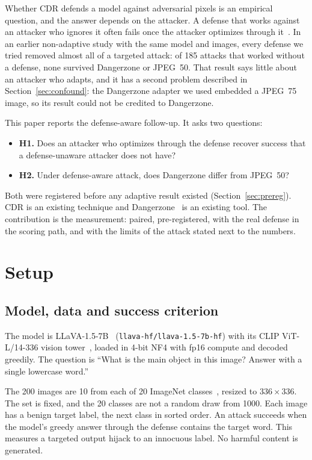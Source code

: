 \documentclass[11pt]{article}
\begin{document}
Whether CDR defends a model against adversarial pixels is an empirical question, and the
answer depends on the attacker. A defense that works against an attacker who ignores it
often fails once the attacker optimizes through it~\cite{athalye2018obfuscated,tramer2020adaptive}.
In an earlier non-adaptive study with the same model and images, every defense we tried
removed almost all of a targeted attack: of 185 attacks that worked without a defense, none
survived Dangerzone or JPEG~50. That result says little about an attacker who adapts, and it
has a second problem described in Section~\ref{sec:confound}: the Dangerzone adapter we
used embedded a JPEG~75 image, so its result could not be credited to Dangerzone.

This paper reports the defense-aware follow-up. It asks two questions:
\begin{itemize}
\item \textbf{H1.} Does an attacker who optimizes through the defense recover success
that a defense-unaware attacker does not have?
\item \textbf{H2.} Under defense-aware attack, does Dangerzone differ from JPEG~50?
\end{itemize}
Both were registered before any adaptive result existed (Section~\ref{sec:prereg}).
CDR is an existing technique and Dangerzone~\cite{dangerzone} is an existing tool. The
contribution is the measurement: paired, pre-registered, with the real defense in the
scoring path, and with the limits of the attack stated next to the numbers.

\section{Setup}

\subsection{Model, data and success criterion}
The model is LLaVA-1.5-7B~\cite{liu2023llava} (\texttt{llava-hf/llava-1.5-7b-hf}) with its
CLIP ViT-L/14-336 vision tower~\cite{radford2021clip}, loaded in 4-bit NF4 with fp16
compute and decoded greedily. The question is ``What is the main object in this image?
Answer with a single lowercase word.''

The 200 images are 10 from each of 20 ImageNet classes~\cite{deng2009imagenet}, resized to
$336\times336$. The set is fixed, and the 20 classes are not a random draw from 1000. Each
image has a benign target label, the next class in sorted order. An attack succeeds when the
model's greedy answer through the defense contains the target word. This measures a
targeted output hijack to an innocuous label. No harmful content is generated.
\end{document}
